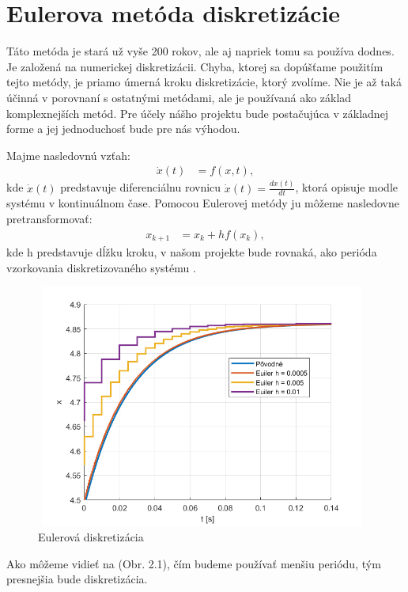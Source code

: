 \section{Eulerova metóda diskretizácie}
\label{se:diskretizacia}
Táto metóda je stará už vyše 200 rokov, ale aj napriek tomu sa používa dodnes. Je založená na numerickej diskretizácii. Chyba, ktorej sa dopúšťame použitím tejto metódy, je priamo úmerná kroku diskretizácie, ktorý zvolíme. Nie je až taká účinná v porovnaní s ostatnými metódami, ale je používaná ako základ komplexnejších metód. Pre účely nášho projektu bude postačujúca v základnej forme a jej jednoduchosť bude pre nás výhodou.

Majme nasledovnú vzťah:
\begin{align}
		\dot{x}(t) &= f(x,t),
\end{align}
kde $\dot{x}(t)$ predstavuje diferenciálnu rovnicu $\dot{x}(t)=\frac{dx(t)}{dt}$, ktorá opisuje modle systému v kontinuálnom čase. Pomocou Eulerovej metódy ju môžeme nasledovne pretransformovať:
\begin{align}
	x_{k+1} &= x_{k} + hf(x_{k}),
\end{align}
kde h predstavuje dĺžku kroku, v našom projekte bude rovnaká, ako perióda vzorkovania diskretizovaného systému \cite{bib9}.
\begin{figure}[H]
	\centering
	\includegraphics[width=11cm,height=8cm]{images/Euler_method}
	\caption{Eulerová diskretizácia}
\end{figure}
Ako môžeme vidieť na (Obr. 2.1), čím budeme používať menšiu periódu, tým presnejšia bude diskretizácia.
